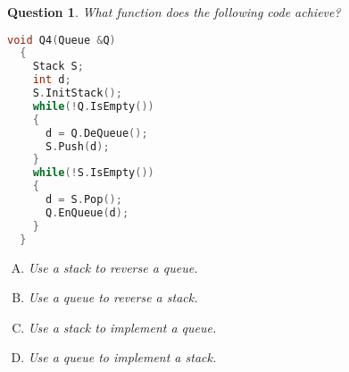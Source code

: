 \documentclass{article}
\newtheorem{Q}{Question}
\begin{document}
\begin{Q}
	What function does the following code achieve?
	\rm{
		\begin{lstlisting}[language=C++]
  void Q4(Queue &Q) 
  {
    Stack S;
	int d;
	S.InitStack();
	while(!Q.IsEmpty())
	{
	  d = Q.DeQueue();
	  S.Push(d);
	}
	while(!S.IsEmpty())
	{
	  d = S.Pop();
	  Q.EnQueue(d);
	}
  }
\end{lstlisting}
	}
	\begin{enumerate}[(A)]
		\item Use a stack to reverse a queue.
		\item Use a queue to reverse a stack.
		\item Use a stack to implement a queue.
		\item Use a queue to implement a stack.
	\end{enumerate}
\end{Q}



\pagebreak
\end{document}

